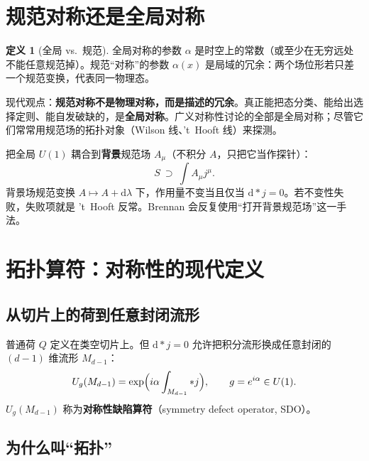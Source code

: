 \documentclass[11pt,a4paper]{article}
\theoremstyle{definition}
\newtheorem{definition}{定义}[section]
\theoremstyle{plain}
\theoremstyle{remark}
\newcommand{\dd}{\mathrm{d}}
\begin{document}
\section{规范对称还是全局对称}
\label{sec:gauge-vs-global}

\begin{definition}[全局 vs.\ 规范]
全局对称的参数 $\alpha$ 是时空上的常数（或至少在无穷远处不能任意规范掉）。规范``对称''的参数 $\alpha(x)$ 是局域的冗余：两个场位形若只差一个规范变换，代表同一物理态。
\end{definition}

\begin{keybox}
现代观点：\textbf{规范对称不是物理对称，而是描述的冗余}。真正能把态分类、能给出选择定则、能自发破缺的，是\textbf{全局对称}。广义对称性讨论的全部是全局对称；尽管它们常常用规范场的拓扑对象（Wilson 线、't~Hooft 线）来探测。
\end{keybox}

把全局 $U(1)$ 耦合到\textbf{背景}规范场 $A_\mu$（不积分 $A$，只把它当作探针）：
\begin{equation}
  S\ \supset\ \int A_\mu j^\mu.
\end{equation}
背景场规范变换 $A\mapsto A+\dd\lambda$ 下，作用量不变当且仅当 $\dd{*}j=0$。若不变性失败，失败项就是 't~Hooft 反常。Brennan 会反复使用``打开背景规范场''这一手法。

\section{拓扑算符：对称性的现代定义}
\label{sec:topo}

\subsection{从切片上的荷到任意封闭流形}

普通荷 $Q$ 定义在类空切片上。但 $\dd{*}j=0$ 允许把积分流形换成任意封闭的 $(d-1)$ 维流形 $M_{d-1}$：
\begin{equation}
\label{eq:sdo}
  U_g(M_{d-1})=\exp\Bigl(i\alpha\int_{M_{d-1}}{*j}\Bigr),\qquad g=e^{i\alpha}\in U(1).
\end{equation}
$U_g(M_{d-1})$ 称为\textbf{对称性缺陷算符}（symmetry defect operator, SDO）。

\subsection{为什么叫``拓扑''}
\end{document}
